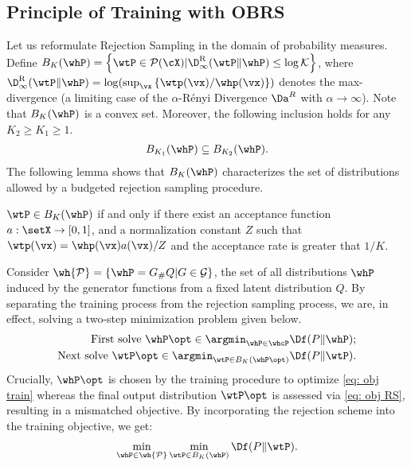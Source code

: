 \documentclass[twoside]{article}
\begin{document}
\subsection{Principle of Training with OBRS}\label{subsec: TOBRS principle}

Let us reformulate Rejection Sampling in the domain of probability measures. Define $B_K(\whP)=\left\{\wtP\in \cal P(\cX) | \D^\mathrm{R}_{\infty}(\wtP\Vert \whP)\leq  \log K \right\}$, where $\D^\mathrm{R}_{\infty}(\wtP\Vert\whP)= \log(\sup_{\vx}\left\{\wtp(\vx)/\whp(\vx)\right\})$ denotes the max-divergence (a limiting case of the $\alpha$-Rényi Divergence $\Da^R$ with $\alpha\to\infty$).
Note that $B_K(\whP)$ is a convex set. Moreover, the following inclusion holds for any $K_2\geq K_1\geq 1$.
\begin{align}
    B_{K_1}(\whP) \subseteq B_{K_2}(\whP).
\end{align}
The following lemma shows that $B_K(\whP)$ characterizes the set of distributions allowed by a budgeted rejection sampling procedure.
\begin{lemma}\label{lem: ball}
 $\wtP\in B_K(\whP)$ if and only if there exist an acceptance function $a:\setX\to[0, 1]$, and a normalization constant $Z$ such that $\wtp(\vx)=\whp(\vx)a(\vx)/Z$ and the acceptance rate is greater that $1/K$.
\end{lemma}
Consider $\wh{\cal P}=\left\{\whP=G_\# Q \vert   G\in \cal G\right\}$, the set of  all distributions $\whP$ induced by the generator functions from a fixed latent distribution $Q$. 
By separating the training process from the rejection sampling process, we are, in effect, solving a two-step minimization problem given below.
\begin{align}
    \text{First solve }\whP\opt\in \argmin_{\whP\in \whcP} \Df (P\Vert \whP);\label{eq: obj train}\\
    \text{Next solve }\wtP\opt\in \argmin_{\wtP\in B_K(\whP\opt)} \Df(P\Vert \wtP).\label{eq: obj RS}
\end{align}
Crucially,  $\whP\opt$ is chosen by the training procedure to optimize \eqref{eq: obj train} whereas the final output distribution $\wtP\opt$ is assessed via \eqref{eq: obj RS}, resulting in a mismatched objective. By incorporating the rejection scheme into the training objective, we get:
\begin{align}\label{eq:trainobrs_prequel}
 \min_{\whP\in\wh{\cal P}}\min_{\wtP\in B_{K}(\whP)}\Df(P\Vert\wtP).
\end{align}
\end{document}
